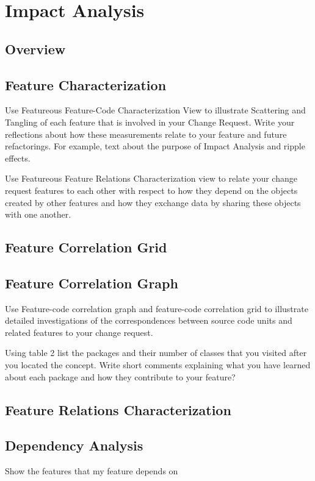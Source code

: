 \section{Impact Analysis}
\subsection{Overview}

\subsection{Feature Characterization}
Use Featureous Feature-Code Characterization View to illustrate Scattering and Tangling of each feature that is involved in your Change Request.
Write your reflections about how these measurements relate to your feature and future refactorings. For example, text about the purpose of Impact Analysis and ripple effects.

Use Featureous Feature Relations Characterization view to relate your change request features to each other with respect to how they depend on the objects created by other features and how they exchange data by sharing these objects with one another.

\subsection{Feature Correlation Grid}
\subsection{Feature Correlation Graph}
Use Feature-code correlation graph and feature-code correlation grid to illustrate detailed investigations of the correspondences between source code units and related features to your change request.

Using table 2 list the packages and their number of classes that you visited after you located the concept. Write short comments explaining what you have learned about each package and how they contribute to your feature?
\subsection{Feature Relations Characterization}
\subsection{Dependency Analysis}

Show the features that my feature depends on

